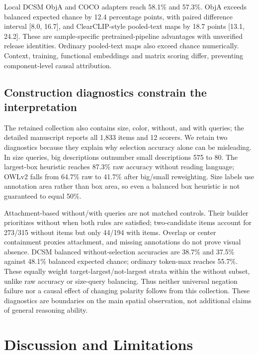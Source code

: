 \documentclass[10pt,twocolumn,letterpaper]{article}
\begin{document}
Local DCSM ObjA and COCO adapters reach 58.1\% and 57.3\%. ObjA exceeds
balanced expected chance by 12.4 percentage points, with paired
difference interval {[}8.0, 16.7{]}, and ClearCLIP-style pooled-text
maps by 18.7 points {[}13.1, 24.2{]}. These are sample-specific
pretrained-pipeline advantages with unverified release identities.
Ordinary pooled-text maps also exceed chance numerically. Context,
training, functional embeddings and matrix scoring differ, preventing
component-level causal attribution.

\subsection{Construction diagnostics constrain the
interpretation}\label{construction-diagnostics-constrain-the-interpretation}

The retained collection also contains size, color, without, and with
queries; the detailed manuscript reports all 1,833 items and 12 scorers.
We retain two diagnostics because they explain why selection accuracy
alone can be misleading. In size queries, big descriptions outnumber
small descriptions 575 to 80. The largest-box heuristic reaches 87.3\%
raw accuracy without reading language; OWLv2 falls from 64.7\% raw to
41.7\% after big/small reweighting. Size labels use annotation area
rather than box area, so even a balanced box heuristic is not guaranteed
to equal 50\%.

Attachment-based without/with queries are not matched controls. Their
builder prioritizes without when both rules are satisfied; two-candidate
items account for 273/315 without items but only 44/194 with items.
Overlap or center containment proxies attachment, and missing
annotations do not prove visual absence. DCSM balanced without-selection
accuracies are 38.7\% and 37.5\% against 48.1\% balanced expected
chance; ordinary token-max reaches 55.7\%. These equally weight
target-largest/not-largest strata within the without subset, unlike raw
accuracy or size-query balancing. Thus neither universal negation
failure nor a causal effect of changing polarity follows from this
collection. These diagnostics are boundaries on the main spatial
observation, not additional claims of general reasoning ability.

\balance
\section{Discussion and Limitations}\label{discussion-and-limitations}
\end{document}
